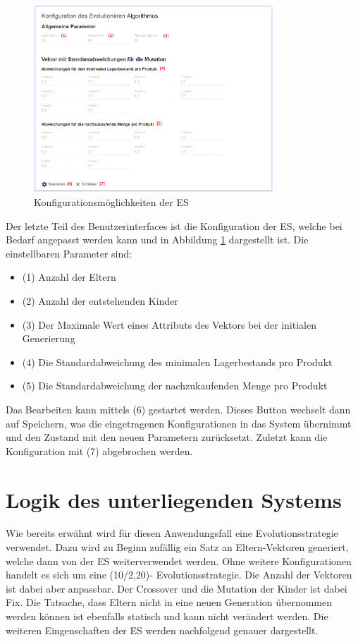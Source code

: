 \documentclass[]{scrartcl}
\begin{document}
\begin{figure}[htbp]
	\centering
	\includegraphics[width=0.8\textwidth]{res/config.png}
	\caption{Konfigurationsmöglichkeiten der ES}
	\label{img:config}
\end{figure}

Der letzte Teil des Benutzerinterfaces ist die Konfiguration der ES, welche bei Bedarf angepasst werden kann und in Abbildung \ref{img:config} dargestellt ist. Die einstellbaren Parameter sind:

\begin{itemize}
	\item (1) Anzahl der Eltern
	\item (2) Anzahl der entstehenden Kinder
	\item (3) Der Maximale Wert eines Attributs des Vektors bei der initialen Generierung
	\item (4) Die Standardabweichung des minimalen Lagerbestands pro Produkt
	\item (5) Die Standardabweichung der nachzukaufenden Menge pro Produkt
\end{itemize}

Das Bearbeiten kann mittels (6) gestartet werden. Dieses Button wechselt dann auf Speichern, was die eingetragenen Konfigurationen in das System übernimmt und den Zustand mit den neuen Parametern zurücksetzt. Zuletzt kann die Konfiguration mit (7) abgebrochen werden.

\newpage
\section{Logik des unterliegenden Systems}
\label{logik}

Wie bereits erwähnt wird für diesen Anwendungsfall eine Evolutionsstrategie verwendet. Dazu wird zu Beginn zufällig ein Satz an Eltern-Vektoren generiert, welche dann von der ES weiterverwendet werden. Ohne weitere Konfigurationen handelt es sich um eine (10/2,20)- Evolutionsstrategie. Die Anzahl der Vektoren ist dabei aber anpassbar. Der Crossover und die Mutation der Kinder ist dabei Fix. Die Tatsache, dass Eltern nicht in eine neuen Generation übernommen werden können ist ebenfalls statisch und kann nicht verändert werden. Die weiteren Eingenschaften der ES werden nachfolgend genauer dargestellt.
\end{document}
